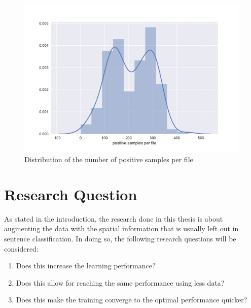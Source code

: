 \begin{figure}[htbp]
  \centering
  \includegraphics[width=\textwidth]{figures/distribution.pdf}
  \caption{Distribution of the number of positive samples per file}
  \label{fig:data_dist}
\end{figure}

\section{Research Question}
As stated in the introduction, the research done in this thesis is about
augmenting the data with the spatial information that is usually left out in
sentence classification. In doing so, the following research questions will be
considered:
\begin{enumerate}
\item Does this increase the learning performance?
\item Does this allow for reaching the same performance using less data?
\item Does this make the training converge to the optimal performance quicker?
\end{enumerate}


